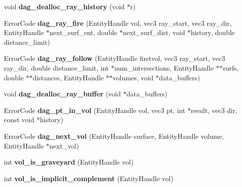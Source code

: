 \begin{DoxyCompactItemize}
\item 
\mbox{\label{namespacepyne_a9243f772bbf6b63bac405c28328dd253}} 
void {\bfseries dag\+\_\+dealloc\+\_\+ray\+\_\+history} (void $\ast$r)
\item 
\mbox{\label{namespacepyne_a64c30defae1f7780ea4a3e1cb16a7a79}} 
Error\+Code {\bfseries dag\+\_\+ray\+\_\+fire} (Entity\+Handle vol, vec3 ray\+\_\+start, vec3 ray\+\_\+dir, Entity\+Handle $\ast$next\+\_\+surf\+\_\+ent, double $\ast$next\+\_\+surf\+\_\+dist, void $\ast$history, double distance\+\_\+limit)
\item 
\mbox{\label{namespacepyne_afc692d9c804c22e7e6b3a30d2d852296}} 
Error\+Code {\bfseries dag\+\_\+ray\+\_\+follow} (Entity\+Handle firstvol, vec3 ray\+\_\+start, vec3 ray\+\_\+dir, double distance\+\_\+limit, int $\ast$num\+\_\+intersections, Entity\+Handle $\ast$$\ast$surfs, double $\ast$$\ast$distances, Entity\+Handle $\ast$$\ast$volumes, void $\ast$data\+\_\+buffers)
\item 
\mbox{\label{namespacepyne_a9451bba0ed3cd9857c7452cec04ab031}} 
void {\bfseries dag\+\_\+dealloc\+\_\+ray\+\_\+buffer} (void $\ast$data\+\_\+buffers)
\item 
\mbox{\label{namespacepyne_ae69cdb5021f7dd38def0bbebaa3a99b3}} 
Error\+Code {\bfseries dag\+\_\+pt\+\_\+in\+\_\+vol} (Entity\+Handle vol, vec3 pt, int $\ast$result, vec3 dir, const void $\ast$history)
\item 
\mbox{\label{namespacepyne_a83bf77ef33027053fa8ddec223554641}} 
Error\+Code {\bfseries dag\+\_\+next\+\_\+vol} (Entity\+Handle surface, Entity\+Handle volume, Entity\+Handle $\ast$next\+\_\+vol)
\item 
\mbox{\label{namespacepyne_a7844def8817d3880424ed61a474ec8ab}} 
int {\bfseries vol\+\_\+is\+\_\+graveyard} (Entity\+Handle vol)
\item 
\mbox{\label{namespacepyne_ab3a6e65aa714fb05584dcbe5fb4e67c3}} 
int {\bfseries vol\+\_\+is\+\_\+implicit\+\_\+complement} (Entity\+Handle vol)
\item 
\mbox{\label{namespacepyne_a0068d2c04f0b12f020479176ded0ca99}} 
$$
\end{DoxyCompactItemize}

